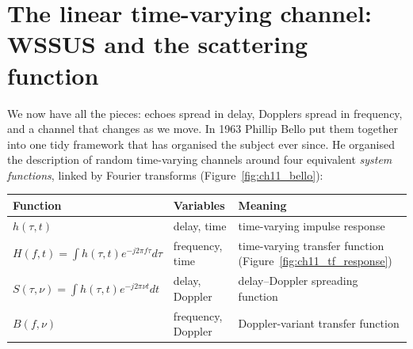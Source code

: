\section{The linear time-varying channel: WSSUS and the scattering function}
\label{sec:ch11:wssus}

We now have all the pieces: echoes spread in delay, Dopplers spread in frequency, and a channel
that changes as we move. In 1963 Phillip Bello put them together into one tidy framework that has
organised the subject ever since. He organised the description of random time-varying channels
around four equivalent \emph{system functions}, linked by Fourier transforms
(Figure~\ref{fig:ch11_bello}):
\begin{center}\small
\begin{tabular}{@{}lll@{}}
\toprule
Function & Variables & Meaning\\
\midrule
$h(\tau,t)$ & delay, time & time-varying impulse response\\
$H(f,t)=\int h(\tau,t)e^{-j2\pi f\tau}d\tau$ & frequency, time & time-varying transfer function (Figure~\ref{fig:ch11_tf_response})\\
$S(\tau,\nu)=\int h(\tau,t)e^{-j2\pi\nu t}dt$ & delay, Doppler & delay--Doppler spreading function\\
$B(f,\nu)$ & frequency, Doppler & Doppler-variant transfer function\\
\bottomrule
\end{tabular}
\end{center}

